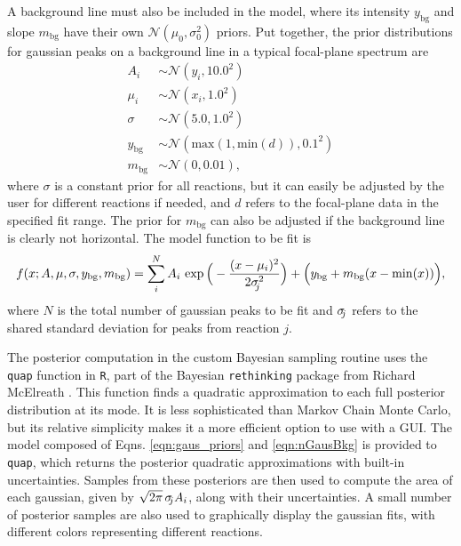 A background line must also be included in the model, where its intensity $y_{\mathrm{bg}}$ and slope $m_{\mathrm{bg}}$ have their own $\mathcal{N}(\mu_{0}, \sigma_{0}^{2})$ priors. Put together, the prior distributions for gaussian peaks on a background line in a typical focal-plane spectrum are
\begin{align}
    A_{i} &\sim \mathcal{N}(y_{i}, 10.0^{2}) \nonumber \\
    \mu_{i} &\sim \mathcal{N}(x_{i}, 1.0^{2}) \nonumber \\
    \sigma &\sim \mathcal{N}(5.0, 1.0^{2}) \nonumber \\
    y_{\mathrm{bg}} &\sim \mathcal{N}(\mathrm{max}(1, \mathrm{min}(d)), 0.1^{2}) \nonumber \\
    m_{\mathrm{bg}} &\sim \mathcal{N}(0, 0.01), \label{eqn:gaus_priors}
\end{align}
where $\sigma$ is a constant prior for all reactions, but it can easily be adjusted by the user for different reactions if needed, and $d$ refers to the focal-plane data in the specified fit range. The prior for $m_{\mathrm{bg}}$ can also be adjusted if the background line is clearly not horizontal. The model function to be fit is
\begin{equation}
    f(x;A,\mu,\sigma,y_{\mathrm{bg}},m_{\mathrm{bg}}) = \sum_{i}^{N} A_{i} \, \exp \Big( -\frac{(x-\mu_{i})^{2}}{2\sigma_{\hspace{-0.08cm} j}^{2}} \Big) + \Big(y_{\mathrm{bg}} + m_{\mathrm{bg}} (x - \mathrm{min}(x))\Big), \label{eqn:nGausBkg}
\end{equation}
where $N$ is the total number of gaussian peaks to be fit and $\sigma_{\hspace{-0.08cm} j}$ refers to the shared standard deviation for peaks from reaction $j$.

The posterior computation in the custom Bayesian sampling routine uses the \texttt{quap} function in \texttt{R}, part of the Bayesian \texttt{rethinking} package from Richard McElreath \cite{McElreath2020}. This function finds a quadratic approximation to each full posterior distribution at its mode. It is less sophisticated than Markov Chain Monte Carlo, but its relative simplicity makes it a more efficient option to use with a GUI. The model composed of Eqns. \ref{eqn:gaus_priors} and \ref{eqn:nGausBkg} is provided to \texttt{quap}, which returns the posterior quadratic approximations with built-in uncertainties. Samples from these posteriors are then used to compute the area of each gaussian, given by $\sqrt{2\pi} \, \sigma_{\hspace{-0.08cm} j} A_{i}$, along with their uncertainties. A small number of posterior samples are also used to graphically display the gaussian fits, with different colors representing different reactions.

